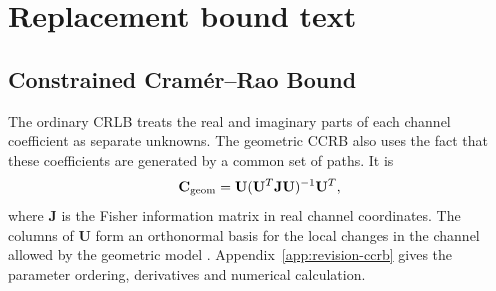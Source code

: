 \documentclass[11pt,a4paper]{article}
\begin{document}
\begin{center}
\end{center}


\section{Replacement bound text}

\subsection{Constrained Cram\'er--Rao Bound}
\label{sec:revised-ccrb}

The ordinary CRLB treats the real and imaginary parts of each channel
coefficient as separate unknowns. The geometric CCRB also uses the fact
that these coefficients are generated by a common set of paths. It is
\begin{equation}
\mathbf C_{\rm geom}
=\mathbf U(\mathbf U^T\mathbf J\mathbf U)^{-1}\mathbf U^T,
\label{eq:revision-ccrb}
\end{equation}
where $\mathbf J$ is the Fisher information matrix in real channel
coordinates. The columns of $\mathbf U$ form an orthonormal basis for the
local changes in the channel allowed by the geometric model
\cite{gorman1990,stoica1998}. Appendix~\ref{app:revision-ccrb} gives the
parameter ordering, derivatives and numerical calculation.
\end{document}
